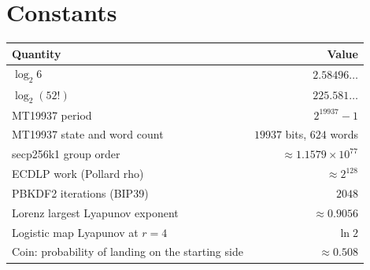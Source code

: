 \documentclass[11pt,a4paper]{article}
\theoremstyle{plain}
\theoremstyle{definition}
\begin{document}
\section{Constants}

\begin{table}[H]
\centering\small
\begin{tabular}{@{}lr@{}}
\toprule
Quantity & Value \\
\midrule
$\log_2 6$ & $2.58496\ldots$ \\
$\log_2(52!)$ & $225.581\ldots$ \\
MT19937 period & $2^{19937}-1$ \\
MT19937 state and word count & $19937$ bits, $624$ words \\
secp256k1 group order & $\approx1.1579\times10^{77}$ \\
ECDLP work (Pollard rho) & $\approx2^{128}$ \\
PBKDF2 iterations (BIP39) & $2048$ \\
Lorenz largest Lyapunov exponent & $\approx0.9056$ \\
Logistic map Lyapunov at $r=4$ & $\ln2$ \\
Coin: probability of landing on the starting side & $\approx0.508$ \\
\bottomrule
\end{tabular}
\end{table}
\end{document}

